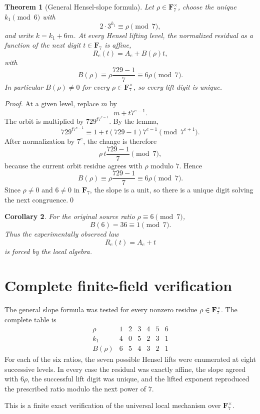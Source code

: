 \documentclass[11pt]{article}
\newtheorem{theorem}{Theorem}[section]
\newtheorem{corollary}[theorem]{Corollary}
\theoremstyle{definition}
\theoremstyle{remark}
\begin{document}
\begin{theorem}[General Hensel-slope formula]
Let $\rho\in\mathbf F_7^\times$, choose the unique $k_1\pmod6$ with
\[
2\cdot3^{k_1}\equiv\rho\pmod7,
\]
and write $k=k_1+6m$. At every Hensel lifting level, the normalized residual as a function of the next digit $t\in\mathbf F_7$ is affine,
\[
R_e(t)=A_e+B(\rho)t,
\]
with
\[
\boxed{
B(\rho)
\equiv
\rho\frac{729-1}{7}
\equiv6\rho
\pmod7.
}
\]
In particular $B(\rho)\ne0$ for every $\rho\in\mathbf F_7^\times$, so every lift digit is unique.
\end{theorem}

\begin{proof}
At a given level, replace $m$ by
\[
m+t7^{e-1}.
\]
The orbit is multiplied by $729^{t7^{e-1}}$. By the lemma,
\[
729^{t7^{e-1}}
\equiv
1+t(729-1)7^{e-1}
\pmod{7^{e+1}}.
\]
After normalization by $7^e$, the change is therefore
\[
\rho\,t\frac{729-1}{7}\pmod7,
\]
because the current orbit residue agrees with $\rho$ modulo $7$. Hence
\[
B(\rho)
\equiv
\rho\frac{729-1}{7}
\equiv6\rho\pmod7.
\]
Since $\rho\ne0$ and $6\ne0$ in $\mathbf F_7$, the slope is a unit, so there is a unique digit solving the next congruence.\qed\end{proof}

\begin{corollary}
For the original source ratio $\rho\equiv6\pmod7$,
\[
B(6)=36\equiv1\pmod7.
\]
Thus the experimentally observed law
\[
R_e(t)=A_e+t
\]
is forced by the local algebra.
\end{corollary}

\section{Complete finite-field verification}
The general slope formula was tested for every nonzero residue $\rho\in\mathbf F_7^\times$. The complete table is
\[
\begin{array}{c|cccccc}
\rho&1&2&3&4&5&6\\
\hline
k_1&4&0&5&2&3&1\\
B(\rho)&6&5&4&3&2&1
\end{array}
\]
For each of the six ratios, the seven possible Hensel lifts were enumerated at eight successive levels. In every case the residual was exactly affine, the slope agreed with $6\rho$, the successful lift digit was unique, and the lifted exponent reproduced the prescribed ratio modulo the next power of $7$.

This is a finite exact verification of the universal local mechanism over $\mathbf F_7^\times$.
\end{document}
